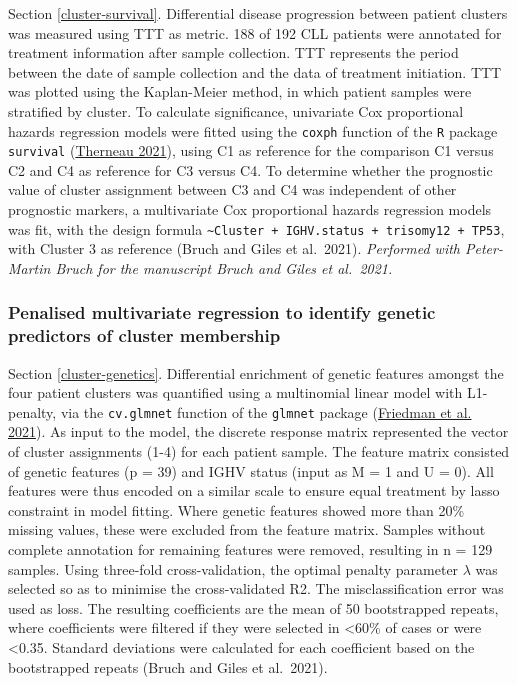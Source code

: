 \documentclass[11pt, a4paper, twosided]{book}
\begin{document}
Section \ref{cluster-survival}. Differential disease progression between patient clusters was measured using TTT as metric. 188 of 192 CLL patients were annotated for treatment information after sample collection. TTT represents the period between the date of sample collection and the data of treatment initiation. TTT was plotted using the Kaplan-Meier method, in which patient samples were stratified by cluster. To calculate significance, univariate Cox proportional hazards regression models were fitted using the \texttt{coxph} function of the \texttt{R} package \texttt{survival} (\protect\hyperlink{ref-R-survival}{Therneau 2021}), using C1 as reference for the comparison C1 versus C2 and C4 as reference for C3 versus C4. To determine whether the prognostic value of cluster assignment between C3 and C4 was independent of other prognostic markers, a multivariate Cox proportional hazards regression models was fit, with the design formula \texttt{\textasciitilde{}Cluster\ +\ IGHV.status\ +\ trisomy12\ +\ TP53}, with Cluster 3 as reference (Bruch and Giles et al.~2021). \emph{Performed with Peter-Martin Bruch for the manuscript Bruch and Giles et al.~2021.}

\hypertarget{cluster-genetics-method}{%
\subsubsection{Penalised multivariate regression to identify genetic predictors of cluster membership}\label{cluster-genetics-method}}

Section \ref{cluster-genetics}. Differential enrichment of genetic features amongst the four patient clusters was quantified using a multinomial linear model with L1-penalty, via the \texttt{cv.glmnet} function of the \texttt{glmnet} package (\protect\hyperlink{ref-R-glmnet}{Friedman et al. 2021}). As input to the model, the discrete response matrix represented the vector of cluster assignments (1-4) for each patient sample. The feature matrix consisted of genetic features (p = 39) and IGHV status (input as M = 1 and U = 0). All features were thus encoded on a similar scale to ensure equal treatment by lasso constraint in model fitting. Where genetic features showed more than 20\% missing values, these were excluded from the feature matrix. Samples without complete annotation for remaining features were removed, resulting in n = 129 samples. Using three-fold cross-validation, the optimal penalty parameter \(\lambda\) was selected so as to minimise the cross-validated R2. The misclassification error was used as loss. The resulting coefficients are the mean of 50 bootstrapped repeats, where coefficients were filtered if they were selected in \textless60\% of cases or were \textless0.35. Standard deviations were calculated for each coefficient based on the bootstrapped repeats (Bruch and Giles et al.~2021).
\end{document}
